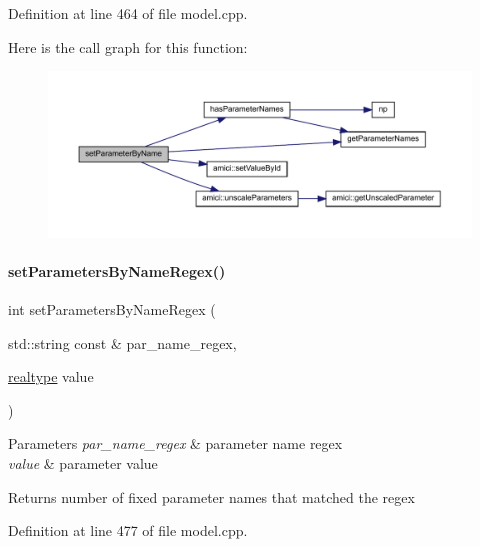 Definition at line 464 of file model.\+cpp.

Here is the call graph for this function\+:
\nopagebreak
\begin{figure}[H]
\begin{center}
\leavevmode
\includegraphics[width=350pt]{classamici_1_1_model_a6c5ceb2ba684cf68a7f21ad865091200_cgraph}
\end{center}
\end{figure}
\mbox{\label{classamici_1_1_model_a1307ed45ccda80e84174d6b495c85d8d}} 
\paragraph{\texorpdfstring{setParametersByNameRegex()}{setParametersByNameRegex()}}
{\footnotesize\ttfamily int set\+Parameters\+By\+Name\+Regex (\begin{DoxyParamCaption}\item[{std\+::string const \&}]{par\+\_\+name\+\_\+regex,  }\item[{\mbox{\hyperlink{namespaceamici_a1bdce28051d6a53868f7ccbf5f2c14a3}{realtype}}}]{value }\end{DoxyParamCaption})}


\begin{DoxyParams}{Parameters}
{\em par\+\_\+name\+\_\+regex} & parameter name regex \\
\hline
{\em value} & parameter value \\
\hline
\end{DoxyParams}
\begin{DoxyReturn}{Returns}
number of fixed parameter names that matched the regex 
\end{DoxyReturn}


Definition at line 477 of file model.\+cpp.


